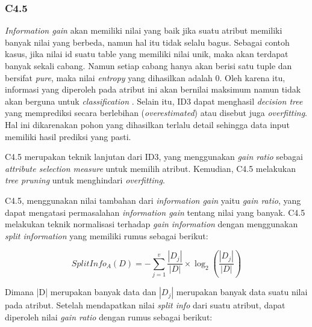 \subsubsection{C4.5}

\textsl{Information gain} akan memiliki nilai yang baik jika suatu atribut memiliki banyak nilai yang berbeda, namun hal itu tidak selalu bagus. Sebagai contoh kasus, jika nilai id suatu table yang memiliki nilai unik, maka akan terdapat banyak sekali cabang. Namun setiap cabang hanya akan berisi satu tuple dan bersifat \textsl{pure}, maka nilai \textsl{entropy} yang dihasilkan adalah 0. Oleh karena itu, informasi yang diperoleh pada atribut ini akan bernilai maksimum namun tidak akan berguna untuk \textsl{classification} \cite{DM}. Selain itu, ID3 dapat menghasil \textsl{decision tree} yang memprediksi secara berlebihan (\textsl{overestimated}) atau disebut juga \textsl{overfitting}. Hal ini dikarenakan pohon yang dihasilkan terlalu detail sehingga data input memiliki hasil prediksi yang pasti. 

C4.5 merupakan teknik lanjutan dari ID3, yang menggunakan \textsl{gain ratio} sebagai \textsl{attribute selection measure} untuk memilih atribut. Kemudian, C4.5 melakukan \textsl{tree pruning} untuk menghindari \textsl{overfitting}.


C4.5, menggunakan nilai tambahan dari \textsl{information gain} yaitu \textsl{gain ratio}, yang dapat mengatasi permasalahan \textsl{information gain} tentang nilai yang banyak. C4.5 melakukan teknik normalisasi terhadap \textsl{gain information} dengan menggunakan \textsl{split information} yang memiliki rumus sebagai berikut:

\begin{displaymath}
	SplitInfo_A(D) = - \sum_{j=1}^v \frac{|D_j|}{|D|} \times \log_2 (\frac{|D_j|}{|D|})
\end{displaymath}

Dimana |D| merupakan banyak data dan $|D_{j}|$ merupakan banyak data suatu nilai pada atribut.
Setelah mendapatkan nilai \textsl{split info} dari suatu atribut, dapat diperoleh nilai \textsl{gain ratio} dengan rumus sebagai berikut:

